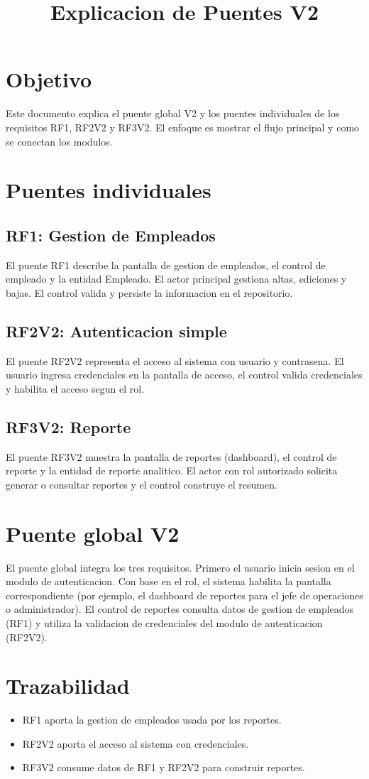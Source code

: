 \documentclass[12pt]{article}
\title{Explicacion de Puentes V2}
\author{}
\date{}
\begin{document}
\maketitle

\section{Objetivo}
Este documento explica el puente global V2 y los puentes individuales de los requisitos RF1, RF2V2 y RF3V2. El enfoque es mostrar el flujo principal y como se conectan los modulos.

\section{Puentes individuales}
\subsection{RF1: Gestion de Empleados}
El puente RF1 describe la pantalla de gestion de empleados, el control de empleado y la entidad Empleado. El actor principal gestiona altas, ediciones y bajas. El control valida y persiste la informacion en el repositorio.

\subsection{RF2V2: Autenticacion simple}
El puente RF2V2 representa el acceso al sistema con usuario y contrasena. El usuario ingresa credenciales en la pantalla de acceso, el control valida credenciales y habilita el acceso segun el rol.

\subsection{RF3V2: Reporte}
El puente RF3V2 muestra la pantalla de reportes (dashboard), el control de reporte y la entidad de reporte analitico. El actor con rol autorizado solicita generar o consultar reportes y el control construye el resumen.

\section{Puente global V2}
El puente global integra los tres requisitos. Primero el usuario inicia sesion en el modulo de autenticacion. Con base en el rol, el sistema habilita la pantalla correspondiente (por ejemplo, el dashboard de reportes para el jefe de operaciones o administrador). El control de reportes consulta datos de gestion de empleados (RF1) y utiliza la validacion de credenciales del modulo de autenticacion (RF2V2).

\section{Trazabilidad}
\begin{itemize}
  \item RF1 aporta la gestion de empleados usada por los reportes.
  \item RF2V2 aporta el acceso al sistema con credenciales.
  \item RF3V2 consume datos de RF1 y RF2V2 para construir reportes.
\end{itemize}
\end{document}
